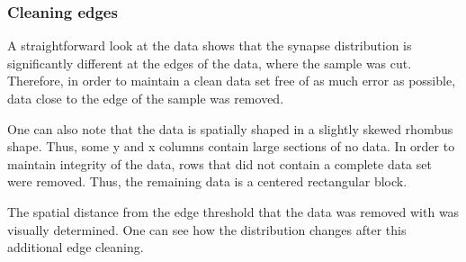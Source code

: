 \documentclass{article}
\begin{document}
\subsubsection{Cleaning edges}

A straightforward look at the data shows that the synapse distribution is significantly different at the edges of the data, where the sample was cut. Therefore, in order to maintain a clean data set free of as much error as possible, data close to the edge of the sample was removed.

One can also note that the data is spatially shaped in a slightly skewed rhombus shape. Thus, some y and x columns contain large sections of no data. In order to maintain integrity of the data, rows that did not contain a complete data set were removed. Thus, the remaining data is a centered rectangular block.

The spatial distance from the edge threshold that the data was removed with was visually determined. One can see how the distribution changes after this additional edge cleaning.
\end{document}
